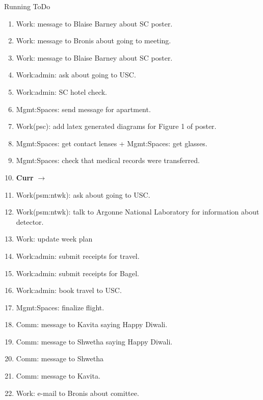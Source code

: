 \begin{columns}
\begin{column}{0.6\linewidth}
\begin{block}{Running ToDo}
\begin{enumerate}
    \item \tiny Work: message to Blaise Barney about SC poster. 
    \item \tiny Work: message to Bronis about going to meeting. 
    \item \tiny Work: message to Blaise Barney about SC poster. 
      
    \item \tiny Work:admin: ask about going to USC. 
  \item \tiny Work:admin: SC hotel check. 
    
  \item \tiny Mgmt:Spaces: send message for apartment. 

  \item \tiny Work(psc): add latex generated diagrams for Figure 1 of
    poster.

  \item \tiny Mgmt:Spaces: get contact lenses + Mgmt:Spaces: get glasses.    
  \item \tiny Mgmt:Spaces: check that medical records were
    transferred. 

  \item \tiny \textbf{Curr} $\rightarrow$ 
  \item \tiny Work(psm:ntwk): ask about going to USC. 
  \item \tiny Work(psm:ntwk): talk to Argonne National Laboratory
    for information about detector.


\item \tiny Work: update week plan 

    \item \tiny Work:admin: submit receipts for travel. 
    
    \item \tiny Work:admin: submit receipts for Bagel. 
    
    \item \tiny Work:admin: book travel to USC. 
    

  \item \tiny Mgmt:Spaces: finalize flight. 
    \item \tiny Comm: message to Kavita saying Happy Diwali. 
    \item \tiny Comm: message to Shwetha saying Happy Diwali. 
    \item \tiny Comm: message to Shwetha 
    \item \tiny Comm: message to Kavita.
  \item \tiny Work: e-mail to Bronis about comittee. 
    

\end{enumerate}
\end{block}
\end{column}
\end{columns}
